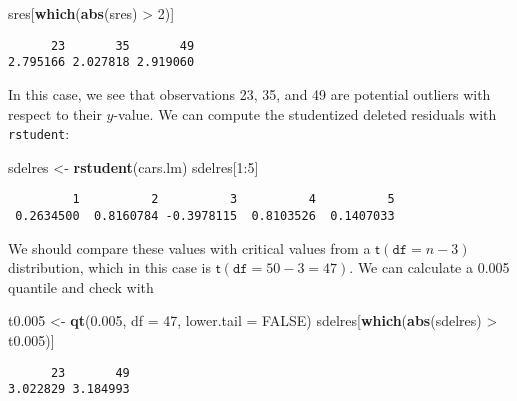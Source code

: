\documentclass[]{book}
\newenvironment{Shaded}{\begin{snugshade}}{\end{snugshade}}
\newcommand{\KeywordTok}[1]{\textcolor[rgb]{0.13,0.29,0.53}{\textbf{{#1}}}}
\newcommand{\DataTypeTok}[1]{\textcolor[rgb]{0.13,0.29,0.53}{{#1}}}
\newcommand{\DecValTok}[1]{\textcolor[rgb]{0.00,0.00,0.81}{{#1}}}
\newcommand{\FloatTok}[1]{\textcolor[rgb]{0.00,0.00,0.81}{{#1}}}
\newcommand{\StringTok}[1]{\textcolor[rgb]{0.31,0.60,0.02}{{#1}}}
\newcommand{\OtherTok}[1]{\textcolor[rgb]{0.56,0.35,0.01}{{#1}}}
\newcommand{\NormalTok}[1]{{#1}}
\numberwithin{equation}{chapter}
\numberwithin{figure}{chapter}
\theoremstyle{plain}
\theoremstyle{definition}
\theoremstyle{remark}
\theoremstyle{definition}
\theoremstyle{definition}
\theoremstyle{remark}
\begin{document}
\begin{Shaded}
\begin{Highlighting}[]
\NormalTok{sres[}\KeywordTok{which}\NormalTok{(}\KeywordTok{abs}\NormalTok{(sres) >}\StringTok{ }\DecValTok{2}\NormalTok{)]}
\end{Highlighting}
\end{Shaded}

\begin{verbatim}
      23       35       49 
2.795166 2.027818 2.919060 
\end{verbatim}

In this case, we see that observations 23, 35, and 49 are potential
outliers with respect to their \(y\)-value. We can compute the
studentized deleted residuals with \texttt{rstudent}:

\begin{Shaded}
\begin{Highlighting}[]
\NormalTok{sdelres <-}\StringTok{ }\KeywordTok{rstudent}\NormalTok{(cars.lm)}
\NormalTok{sdelres[}\DecValTok{1}\NormalTok{:}\DecValTok{5}\NormalTok{]}
\end{Highlighting}
\end{Shaded}

\begin{verbatim}
         1          2          3          4          5 
 0.2634500  0.8160784 -0.3978115  0.8103526  0.1407033 
\end{verbatim}

We should compare these values with critical values from a
\(\mathsf{t}(\mathtt{df}=n-3)\) distribution, which in this case is
\(\mathsf{t}(\mathtt{df}=50-3=47)\). We can calculate a 0.005 quantile
and check with

\begin{Shaded}
\begin{Highlighting}[]
\NormalTok{t0}\FloatTok{.005} \NormalTok{<-}\StringTok{ }\KeywordTok{qt}\NormalTok{(}\FloatTok{0.005}\NormalTok{, }\DataTypeTok{df =} \DecValTok{47}\NormalTok{, }\DataTypeTok{lower.tail =} \OtherTok{FALSE}\NormalTok{)}
\NormalTok{sdelres[}\KeywordTok{which}\NormalTok{(}\KeywordTok{abs}\NormalTok{(sdelres) >}\StringTok{ }\NormalTok{t0}\FloatTok{.005}\NormalTok{)]}
\end{Highlighting}
\end{Shaded}

\begin{verbatim}
      23       49 
3.022829 3.184993 
\end{verbatim}
\end{document}
